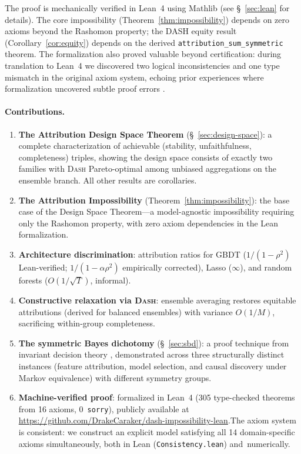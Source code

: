 \documentclass{jmlr}
\newcommand{\DASH}{\textsc{Dash}}
\newcommand{\GBDT}{\textsc{GBDT}}
\begin{document}
The proof is mechanically verified in Lean~4 using Mathlib (see \S~\ref{sec:lean} for details).
The core impossibility (Theorem~\ref{thm:impossibility}) depends on zero axioms beyond the Rashomon property; the DASH equity result (Corollary~\ref{cor:equity}) depends on the derived \texttt{attribution\_sum\_symmetric} theorem.
The formalization also proved valuable beyond certification: during translation to Lean~4 we discovered two logical inconsistencies and one type mismatch in the original axiom system, echoing prior experiences where formalization uncovered subtle proof errors \citep{nipkow2009social,zhang2026statistical}.

\paragraph{Contributions.}
\begin{enumerate}
    \item \textbf{The Attribution Design Space Theorem} (\S~\ref{sec:design-space}): a complete characterization of achievable (stability, unfaithfulness, completeness) triples, showing the design space consists of exactly two families with \DASH{} Pareto-optimal among unbiased aggregations on the ensemble branch. All other results are corollaries.
    \item \textbf{The Attribution Impossibility} (Theorem~\ref{thm:impossibility}): the base case of the Design Space Theorem---a model-agnostic impossibility requiring only the Rashomon property, with zero axiom dependencies in the Lean formalization.
    \item \textbf{Architecture discrimination}: attribution ratios for \GBDT{} ($1/(1{-}\rho^2)$ Lean-verified; $1/(1{-}\alpha\rho^2)$ empirically corrected), Lasso ($\infty$), and random forests ($O(1/\sqrt{T})$, informal).
    \item \textbf{Constructive relaxation via \DASH{}}: ensemble averaging restores equitable attributions (derived for balanced ensembles) with variance $O(1/M)$, sacrificing within-group completeness.
    \item \textbf{The symmetric Bayes dichotomy} (\S~\ref{sec:sbd}): a proof technique from invariant decision theory \citep{lehmann2005testing}, demonstrated across three structurally distinct instances (feature attribution, model selection, and causal discovery under Markov equivalence) with different symmetry groups.
    \item \textbf{Machine-verified proof}: formalized in Lean~4 (305 type-checked theorems from 16 axioms, 0~\texttt{sorry}), publicly available at \url{https://github.com/DrakeCaraker/dash-impossibility-lean}.\linebreak The axiom system is consistent: we construct an explicit model satisfying all 14 domain-specific axioms simultaneously, both in Lean (\texttt{Consistency.lean}) and~numerically.
\end{enumerate}
\end{document}
